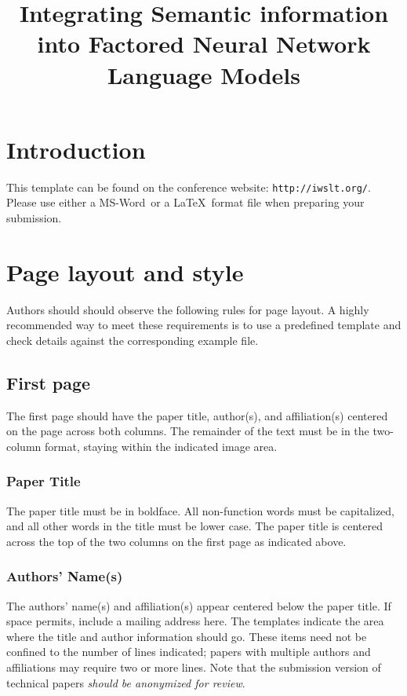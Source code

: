 \documentclass[a4paper]{article}
\title{Integrating Semantic information into Factored Neural Network Language Models}
\def\reg{{\rm\ooalign{\hfil
     \raise.07ex\hbox{\scriptsize R}\hfil\crcr\mathhexbox20D}}}
\begin{document}
\maketitle
%
\begin{abstract}

\end{abstract}


%
\section{Introduction}
This template can be found on the conference 
website: \texttt{http://iwslt.org/}.
Please use either a MS-Word\reg\ or a \LaTeX\ format file
when preparing your submission. 

\section{Page layout and style}

Authors should should observe the following rules for page
layout. A highly  recommended way to meet these requirements
is to use a predefined template and check
details against the corresponding example file.

\subsection{First page}

The first page should have the paper title, author(s), and affiliation(s)
centered on the page across both columns. The remainder of the text 
must be in the two-column format, staying within the indicated image 
area. 

\subsubsection{Paper Title}
The paper title must be in boldface. All non-function words must be capitalized,
and all other words in the title must be lower case. The paper title is centered
across the top of the two columns on the first page as indicated above.

\subsubsection{Authors' Name(s)}
The authors' name(s) and affiliation(s) appear centered below the paper
title. If space permits, include a mailing address here. The templates indicate
the area where the title and author information should go. These items need not
be confined to the number of lines indicated; papers with multiple
authors and affiliations may require two or more lines. 
Note that the submission version of technical papers \emph{should be 
anonymized for review}. 
\end{document}
